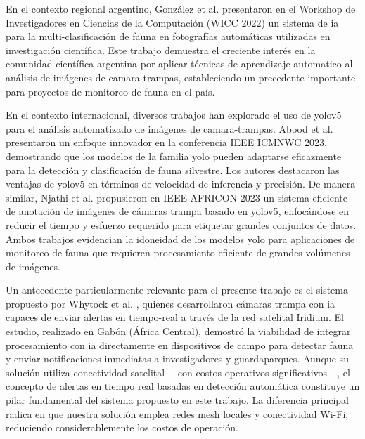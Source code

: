\documentclass[a4paper, 12pt]{report}
\begin{document}
En el contexto regional argentino, González et al. \cite{gonzalez2022fauna}
presentaron en el Workshop de Investigadores en Ciencias de la Computación
(WICC 2022) un sistema de \gls{ia} para la multi-clasificación de fauna
en fotografías automáticas utilizadas en investigación científica. Este
trabajo demuestra el creciente interés en la comunidad científica argentina
por aplicar técnicas de \gls{aprendizaje-automatico} al análisis de imágenes
de \glspl{camara-trampa}, estableciendo un precedente importante para
proyectos de monitoreo de fauna en el país.

En el contexto internacional, diversos trabajos han explorado el uso de
\gls{yolov5} para el análisis automatizado de imágenes de \glspl{camara-trampa}.
Abood et al. \cite{abood2023yolov5wildlife} presentaron un enfoque innovador
en la conferencia IEEE ICMNWC 2023, demostrando que los modelos de la familia
\gls{yolo} pueden adaptarse eficazmente para la detección y clasificación
de fauna silvestre. Los autores destacaron las ventajas de \gls{yolov5} en
términos de velocidad de \gls{inferencia} y precisión. De manera similar,
Njathi et al. \cite{njathi2023annotation} propusieron en IEEE AFRICON 2023
un sistema eficiente de anotación de imágenes de cámaras trampa basado en
\gls{yolov5}, enfocándose en reducir el tiempo y esfuerzo requerido para
etiquetar grandes conjuntos de datos. Ambos trabajos evidencian la idoneidad
de los modelos \gls{yolo} para aplicaciones de monitoreo de fauna que
requieren procesamiento eficiente de grandes volúmenes de imágenes.

Un antecedente particularmente relevante para el presente trabajo es el
sistema propuesto por Whytock et al. \cite{whytock2023iridium}, quienes
desarrollaron cámaras trampa con \gls{ia} capaces de enviar alertas en
\gls{tiempo-real} a través de la red satelital Iridium. El estudio, realizado
en Gabón (África Central), demostró la viabilidad de integrar procesamiento
con \gls{ia} directamente en dispositivos de campo para detectar fauna y
enviar notificaciones inmediatas a investigadores y guardaparques. Aunque
su solución utiliza conectividad satelital ---con costos operativos
significativos---, el concepto de alertas en tiempo real basadas en
detección automática constituye un pilar fundamental del sistema propuesto
en este trabajo. La diferencia principal radica en que nuestra solución
emplea redes \gls{mesh} locales y conectividad Wi-Fi, reduciendo
considerablemente los costos de operación.
\end{document}
